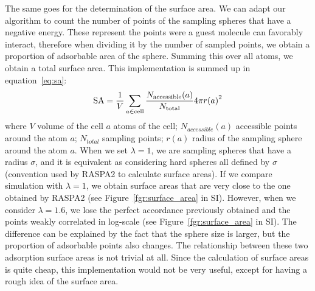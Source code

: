 \documentclass[main]{subfiles}
\begin{document}
The same goes for the determination of the surface area. We can adapt our algorithm to count the number of points of the sampling spheres that have a negative energy. These represent the points were a guest molecule can favorably interact, therefore when dividing it by the number of sampled points, we obtain a proportion of adsorbable area of the sphere. Summing this over all atoms, we obtain a total surface area. This implementation is summed up in equation~\ref{eq:sa}:
\begin{equation}
\label{eq:sa}
    \textrm{SA} = \dfrac{1}{V}\sum_{a\in \textrm{cell}} \dfrac{N_{\text{accessible}}(a)}{N_{\text{total}}}4\pi {r(a)}^2
\end{equation}
where $V$ volume of the cell $a$ atoms of the cell; $N_{accessible}(a)$ accessible points around the atom $a$; $N_{total}$ sampling points; $r(a)$ radius of the sampling sphere around the atom $a$.
When we set $\lambda=1$, we are sampling spheres that have a radius $\sigma$, and it is equivalent as considering hard spheres all defined by $\sigma$ (convention used by RASPA2 to calculate surface areas). If we compare simulation with $\lambda=1$, we obtain surface areas that are very close to the one obtained by RASPA2 (see Figure~\ref{fgr:surface_area} in SI). However, when we consider $\lambda=1.6$, we lose the perfect accordance previously obtained and the points weakly correlated in log-scale (see Figure~\ref{fgr:surface_area} in SI). The difference can be explained by the fact that the sphere size is larger, but the proportion of adsorbable points also changes. The relationship between these two adsorption surface areas is not trivial at all. Since the calculation of surface areas is quite cheap, this implementation would not be very useful, except for having a rough idea of the surface area.
\end{document}
